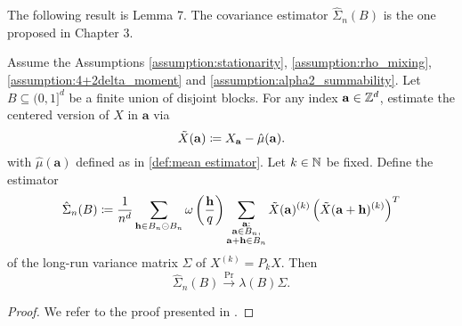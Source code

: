 The following result is \cite{[0]BUCCHIA2017344} Lemma 7. The covariance estimator $\hat{\Sigma}_n(B)$ is the one proposed in \cite{[8]BUCCHIA2015104} Chapter 3.
\begin{lemma} \label{lemma:7}
    Assume the Assumptions \ref{assumption:stationarity}, \ref{assumption:rho_mixing}, \ref{assumption:4+2delta_moment} and \ref{assumption:alpha2_summability}. Let $B \subseteq (0, 1]^d$ be a finite union of disjoint blocks.
    For any index $\mathbf{a} \in \mathbb{Z}^d$, estimate the centered version of $X$ in $\mathbf{a}$ via
    \[ \Tilde{X}(\mathbf{a}) \coloneqq X_{\mathbf{a}} - \hat{\mu}(\mathbf{a}). \]
    with $\hat{\mu}(\mathbf{a})$ defined as in \eqref{def:mean estimator}. Let $k \in \mathbb{N}$ be fixed. Define the estimator
    \[ \hat{\Sigma}_n(B) \coloneqq \frac{1}{n^d} \sum\limits_{\mathbf{h} \in B_n \circleddash B_n} \omega\left(\frac{\mathbf{h}}{q} \right) 
    \sum\limits_{\substack{\mathbf{a}:\\ \mathbf{a} \in B_n,\\ \mathbf{a}+\mathbf{h} \in B_n}} \Tilde{X}(\mathbf{a})^{(k)}  \left(\Tilde{X}(\mathbf{a}+\mathbf{h})^{(k)} \right)^T \]
    of the long-run variance matrix $\Sigma$ of $X^{(k)} = P_k X$.
    Then
    \[ \hat{\Sigma}_n(B) \overset{\mathrm{Pr}}{\to} \lambda(B) \Sigma. \]
\end{lemma}
\begin{proof}
    We refer to the proof presented in \cite{[0]BUCCHIA2017344}.
\end{proof}
